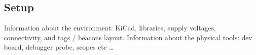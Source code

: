 \subsection{Setup}

Information about the environment: KiCad, libraries, supply voltages, connectivity, and tags / beacons layout.
Information about the physical tools: dev board, debugger probe, scopes etc \dots
